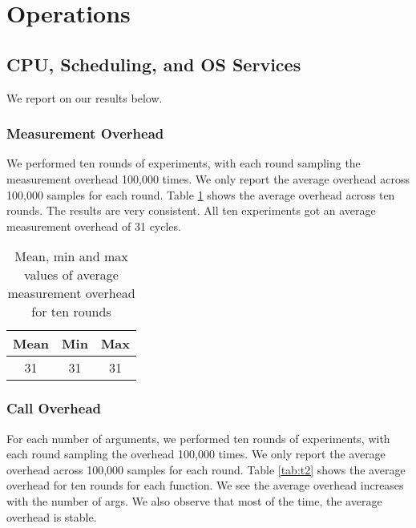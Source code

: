 \section{Operations}

\subsection{CPU, Scheduling, and OS Services}
We report on our results below.
\subsubsection{Measurement Overhead}
We performed ten rounds of experiments, with each round sampling the measurement overhead 100,000 times. We only report the average overhead across 100,000 samples for each round.
Table \ref{tab:t1} shows the average overhead across ten rounds. 
The results are very consistent.
All ten experiments got an average measurement overhead of 31 cycles.

\begin{table}[htb]

\caption{Mean, min and max values of average measurement overhead for ten rounds}

    \begin{tabular}{|c|c|c|} 
     \hline
     Mean & Min & Max \\ 
     \hline
     31 & 31 & 31 \\ 
     \hline
    \end{tabular}
    \label{tab:t1}
\end{table}

\subsubsection{Call Overhead}
For each number of arguments, we performed ten rounds of experiments,
with each round sampling the overhead 100,000 times.
%
We only report the average overhead across 100,000 samples for each
round.
%
Table \ref{tab:t2} shows the average overhead for ten rounds for each
function.
%
We see the average overhead increases with the number of args. We also
observe that most of the time, the average overhead is stable.

